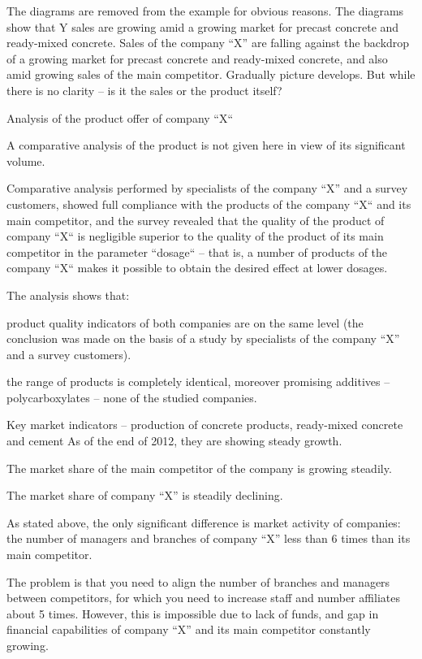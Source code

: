 \documentclass[11pt,a4paper]{book}
\begin{document}
The diagrams are removed from the example for obvious reasons. The diagrams
show that Y sales are growing amid a growing market for precast concrete and
ready-mixed concrete.  Sales of the company “X” are falling against the
backdrop of a growing market for precast concrete and ready-mixed concrete,
and also amid growing sales of the main competitor. Gradually picture
develops. But while there is no clarity -- is it the sales or the product
itself?

Analysis of the product offer of company “X“

A comparative analysis of the product is not given here in view of its
significant volume.

Comparative analysis performed by specialists of the company “X” and a survey
customers, showed full compliance with the products of the company “X“ and its
main competitor, and the survey revealed that the quality of the product of
company “X“ is negligible superior to the quality of the product of its main
competitor in the parameter “dosage“ -- that is, a number of products of the
company “X“ makes it possible to obtain the desired effect at lower dosages.

The analysis shows that:

product quality indicators of both companies are on the same level (the
conclusion was made on the basis of a study by specialists of the company “X”
and a survey customers).

the range of products is completely identical, moreover promising additives --
polycarboxylates -- none of the studied companies.

Key market indicators -- production of concrete products, ready-mixed concrete
and cement As of the end of 2012, they are showing steady growth.

The market share of the main competitor of the company is growing steadily.

The market share of company “X” is steadily declining.

As stated above, the only significant difference is market activity of
companies: the number of managers and branches of company “X” less than 6
times than its main competitor.

The problem is that you need to align the number of branches and managers
between competitors, for which you need to increase staff and number
affiliates about 5 times. However, this is impossible due to lack of funds,
and gap in financial capabilities of company “X” and its main competitor
constantly growing.
\end{document}
